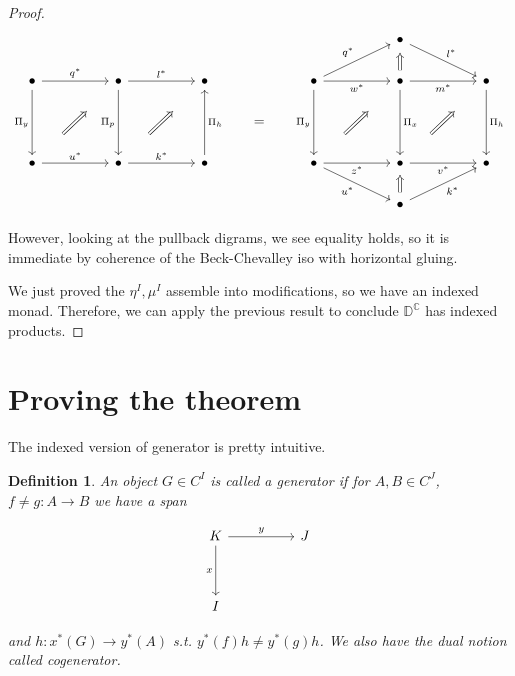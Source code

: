 \documentclass[10pt, oneside]{article}
\newtheorem{definition}[theorem]{Definition}
\begin{document}
\begin{proof}
	\[\begin{tikzcd}
		&&&&&&&& \bullet \\
		\bullet && \bullet && \bullet && \bullet && \bullet && \bullet \\
		&&&&& {=} \\
		\bullet && \bullet && \bullet && \bullet && \bullet && \bullet \\
		&&&&&&&& \bullet
		\arrow["{\Pi_y}"', from=2-1, to=4-1]
		\arrow["{k^\ast}", from=4-3, to=4-5]
		\arrow["{u^\ast}", from=4-1, to=4-3]
		\arrow["{\Pi_p}"', from=2-3, to=4-3]
		\arrow["{q^\ast}", from=2-1, to=2-3]
		\arrow[shorten <=22pt, shorten >=22pt, Rightarrow, from=4-1, to=2-3]
		\arrow["{\Pi_h}", from=2-11, to=4-11]
		\arrow["{l^\ast}", from=1-9, to=2-11]
		\arrow["{q^\ast}", from=2-7, to=1-9]
		\arrow["{m^\ast}"', from=2-9, to=2-11]
		\arrow["{w^\ast}"', from=2-7, to=2-9]
		\arrow[shorten <=2pt, shorten >=3pt, Rightarrow, from=2-9, to=1-9]
		\arrow["{\Pi_x}", from=2-9, to=4-9]
		\arrow["{v^\ast}"', from=4-9, to=4-11]
		\arrow[shorten <=22pt, shorten >=22pt, Rightarrow, from=4-9, to=2-11]
		\arrow["{\Pi_h}"', from=4-5, to=2-5]
		\arrow["{l^\ast}", from=2-3, to=2-5]
		\arrow["{z^\ast}"', from=4-7, to=4-9]
		\arrow["{\Pi_y}"', from=2-7, to=4-7]
		\arrow[shorten <=22pt, shorten >=22pt, Rightarrow, from=4-3, to=2-5]
		\arrow[shorten <=22pt, shorten >=22pt, Rightarrow, from=4-7, to=2-9]
		\arrow["{u^\ast}"', from=4-7, to=5-9]
		\arrow["{k^\ast}"', from=5-9, to=4-11]
		\arrow[shorten <=3pt, shorten >=2pt, Rightarrow, from=5-9, to=4-9]
	\end{tikzcd}\]
	
	However, looking at the pullback digrams, we see equality holds, so it is immediate by coherence of the Beck-Chevalley iso with horizontal gluing.
	
	We just proved the $\eta^I, \mu^I$ assemble into modifications, so we have an indexed monad. Therefore, we can apply the previous result to conclude $\mathbb{D}^\mathbb{C}$ has indexed products. 
\end{proof}

\section{Proving the theorem}

The indexed version of generator is pretty intuitive.
\begin{definition}
    An object $G \in C^I$ is called a generator if for $A, B \in C^J$, $f \neq g: A \to B$ we have a span

    \[\begin{tikzcd}
	K && J \\
	\\
	I
	\arrow["x"', from=1-1, to=3-1]
	\arrow["y", from=1-1, to=1-3]
    \end{tikzcd}\]
    
    \noindent and $h: x^\ast(G) \to y^\ast(A)$ s.t. $y^\ast(f) h \neq y^\ast(g) h$. We also have the dual notion called cogenerator.
    
\end{definition}
\end{document}
